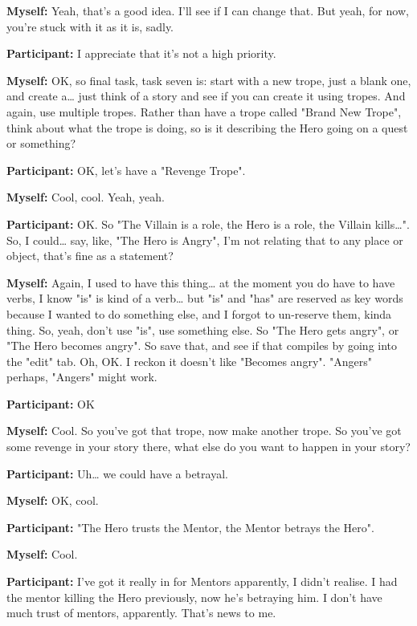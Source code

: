 \documentclass[11pt]{report}
\newcommand{\llabel}[1]{\hypertarget{llineno:#1}{\linelabel{#1}}}
\begin{document}
\begin{linenumbers}
\textbf{Myself:} Yeah, that's a good idea. I'll see if I can change that. But yeah, for now, you're stuck with it as it is, sadly.

\textbf{Participant:} I appreciate that it's not a high priority.

\textbf{Myself:} OK, so final task, task seven is: start with a new trope, just a blank one, and create a\ldots{} just think of a story and see if you can create it using tropes. And again, use multiple tropes. Rather than have a trope called "Brand New Trope", think about what the trope is doing, so is it describing the Hero going on a quest or something?

\textbf{Participant:} OK, let's have a "Revenge Trope".

\textbf{Myself:} Cool, cool. Yeah, yeah.

\textbf{Participant:} OK. So "The Villain is a role, the Hero is a role, the
Villain kills\ldots{}". So, I could\ldots{} say, like, "The Hero is Angry", I'm
not relating that to any place or object, that's fine as a
statement?\llabel{lne:feature2a3}

\textbf{Myself:} Again, I used to have this thing\ldots{} at the moment you do have to have verbs, I know "is" is kind of a verb\ldots{} but "is" and "has" are reserved as key words because I wanted to do something else, and I forgot to un-reserve them, kinda thing. So, yeah, don't use "is", use something else. So "The Hero gets angry", or "The Hero becomes angry". So save that, and see if that compiles by going into the "edit" tab. Oh, OK. I reckon it doesn't like "Becomes angry". "Angers" perhaps, "Angers" might work.

\textbf{Participant:} OK

\textbf{Myself:} Cool. So you've got that trope, now make another trope. So you've got some revenge in your story there, what else do you want to happen in your story?

\textbf{Participant:} Uh\ldots{} we could have a betrayal.

\textbf{Myself:} OK, cool.

\textbf{Participant:} "The Hero trusts the Mentor, the Mentor betrays the Hero".

\textbf{Myself:} Cool.

\textbf{Participant:} I've got it really in for Mentors apparently, I didn't realise. I had the mentor killing the Hero previously, now he's betraying him. I don't have much trust of mentors, apparently. That's news to me.


\end{linenumbers}
\end{document}
